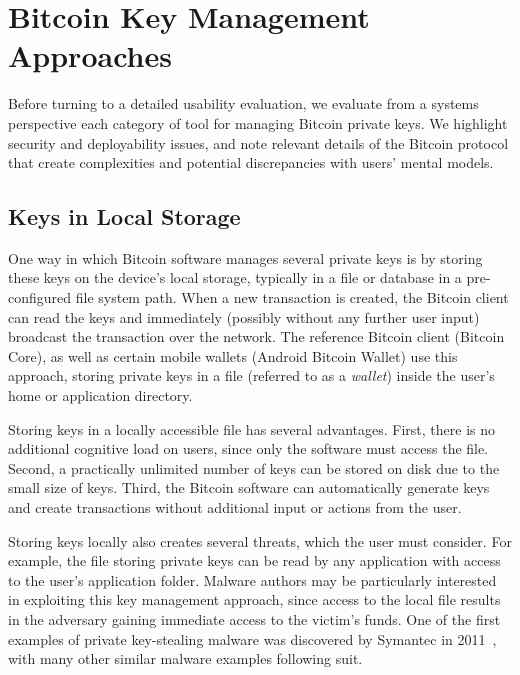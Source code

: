 
\section{Bitcoin Key Management Approaches} 
\label{sec:approaches}

Before turning to a detailed usability evaluation, we evaluate from a systems perspective each category of tool for managing Bitcoin private keys. We highlight security and deployability issues, and note relevant details of the Bitcoin protocol that create complexities and potential discrepancies with users' mental models.

\subsection{Keys in Local Storage}
\label{sec:localstorage}
One way in which Bitcoin software manages several private keys is by storing these keys on the device's local storage, typically in a file or database in a pre-configured file system path. When a new transaction is created, the Bitcoin client can read the keys and immediately (possibly without any further user input) broadcast the transaction over the network. The reference Bitcoin client (Bitcoin Core), as well as certain mobile wallets (\eg Android Bitcoin Wallet) use this approach, storing private keys in a file (referred to as a \emph{wallet}) inside the user's home or application directory. 

Storing keys in a locally accessible file has several advantages. First, there is no additional cognitive load on users, since only the software must access the file. Second, a practically unlimited number of keys can be stored on disk due to the small size of keys. Third, the Bitcoin software can automatically generate keys and create transactions without additional input or actions from the user. 

Storing keys locally also creates several threats, which the user must consider. For example, the file storing private keys can be read by any application with access to the user's application folder. Malware authors may be particularly interested in exploiting this key management approach, since access to the local file results in the adversary gaining immediate access to the victim's funds. One of the first examples of private key-stealing malware was discovered by Symantec in 2011~\cite{coinbit}, with many other similar malware examples following suit.

